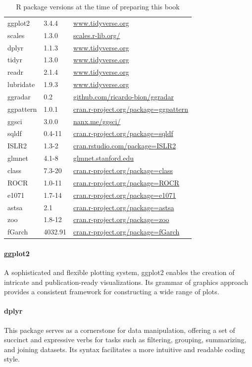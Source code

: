 \begin{withcode}
\begin{table}
\renewcommand{\arraystretch}{1.25}
\begin{tabular}{l|l|l} \hline
ggplot2 & 3.4.4 & \url{www.tidyverse.org} \\
scales & 1.3.0 & \url{scales.r-lib.org/} \\
dplyr & 1.1.3 & \url{www.tidyverse.org} \\
tidyr & 1.3.0 & \url{www.tidyverse.org} \\
readr & 2.1.4 & \url{www.tidyverse.org} \\
lubridate & 1.9.3 & \url{www.tidyverse.org} \\
ggradar & 0.2 & \url{github.com/ricardo-bion/ggradar} \\
ggpattern & 1.0.1 & \url{cran.r-project.org/package=ggpattern} \\
ggsci & 3.0.0 & \url{nanx.me/ggsci/} \\
sqldf & 0.4-11 & \url{cran.r-project.org/package=sqldf} \\
ISLR2 & 1.3-2 & \url{cran.rstudio.com/package=ISLR2} \\
glmnet & 4.1-8 & \url{glmnet.stanford.edu} \\
class & 7.3-20 & \url{cran.r-project.org/package=class} \\
ROCR & 1.0-11 & \url{cran.r-project.org/package=ROCR} \\
e1071 & 1.7-14 & \url{cran.r-project.org/package=e1071} \\
astsa & 2.1 & \url{cran.r-project.org/package=astsa} \\
zoo & 1.8-12 & \url{cran.r-project.org/package=zoo} \\
fGarch & 4032.91 & \url{cran.r-project.org/package=fGarch} \\ \hline
\end{tabular}
\caption[R packages used in this book]{R package versions at the time of preparing this book}
\label{tab:Rsoftware}
\end{table}

\paragraph*{ggplot2} A sophisticated and flexible plotting system, ggplot2 enables the creation of intricate and publication-ready visualizations. Its grammar of graphics approach provides a consistent framework for constructing a wide range of plots.

\paragraph*{dplyr} This package serves as a cornerstone for data manipulation, offering a set of succinct and expressive verbs for tasks such as filtering, grouping, summarizing, and joining datasets. Its syntax facilitates a more intuitive and readable coding style.


\end{withcode}
